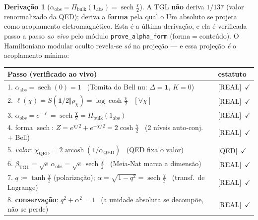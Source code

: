 \documentclass[11pt]{article}
\newcommand{\bTGL}{\beta_{\mathrm{TGL}}}\newcommand{\Msun}{M_{\odot}}\newcommand{\TGL}{\mathrm{TGL}}
\theoremstyle{definition}\newtheorem{deriv}{Derivação}
\begin{document}
\begin{deriv}[$\alpha_{\mathrm{obs}}=\Pi_{\mathrm{bulk}}(1_{\mathrm{abs}})=\operatorname{sech}\tfrac\chi2$]

A TGL \textbf{não} deriva $1/137$ (valor renormalizado da QED); deriva a \textbf{forma} pela qual o Um absoluto se projeta como acoplamento eletromagnético. Esta é a última derivação, e ela é verificada passo a passo \emph{ao vivo} pelo módulo \texttt{prove\_alpha\_form} (forma$=$conteúdo). O Hamiltoniano modular oculto revela-se \emph{só} na projeção --- e essa projeção \emph{é} o acoplamento mínimo:

\begin{center}\small\begin{tabular}{p{} l}\hline

\textbf{Passo (verificado ao vivo)} & \textbf{estatuto} \\\hline

1. $\alpha_{\mathrm{abs}}=\operatorname{sech}(0)=1$ \ (Tomita do Bell nu: $\Delta=\mathbf 1$, $K=0$) & \textsf{[REAL]}~$\checkmark$ \\

2. $\ell(\chi)=S(\mathbf 1/2\Vert\rho_\chi)=\log\cosh\tfrac\chi2$ \ $[\forall\chi]$ & \textsf{[REAL]}~$\checkmark$ \\

3. $\alpha_{\mathrm{obs}}=e^{-\ell}=\operatorname{sech}\tfrac\chi2=\Pi_{\mathrm{bulk}}(1_{\mathrm{abs}})$ & \textsf{[REAL]}~$\checkmark$ \\

4. forma $\operatorname{sech}$: $Z=e^{\chi/2}+e^{-\chi/2}=2\cosh\tfrac\chi2$ \ (2 níveis auto-conj.\ $+$ Bell) & \textsf{[REAL]}~$\checkmark$ \\

5. \emph{valor}: $\chi_{\mathrm{QED}}=2\operatorname{arcosh}(1/\alpha_{\mathrm{QED}})$ \ (QED fixa o valor) & \textsf{[QED]}~$\checkmark$ \\

6. $\bTGL=\sqrt e\,\alpha_{\mathrm{obs}}=\sqrt e\,\operatorname{sech}\tfrac\chi2$ \ (Meia-Nat marca a dimensão) & \textsf{[REAL]}~$\checkmark$ \\

7. $q:=\tanh\tfrac\chi2$ (polarização); $\alpha=\sqrt{1-q^2}=\operatorname{sech}\tfrac\chi2$ \ (transf.\ de Lagrange) & \textsf{[REAL]}~$\checkmark$ \\

8. \textbf{conservação}: $q^2+\alpha^2=1$ \ (a unidade absoluta se decompõe, não se perde) & \textsf{[REAL]}~$\checkmark$ \\


\end{tabular}
\end{center}
\end{deriv}
\end{document}
